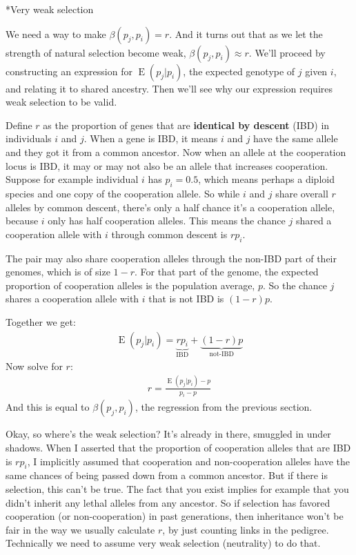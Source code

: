 \documentclass[10pt,reqno]{amsbook}
\makeatletter
\DeclareMathOperator{\E}{E}
\newcommand{\bemph}[1]{{\textbf{\textcolor{bemphcol}{#1}}}}
\renewcommand\subsection{\@startsection{subsection}{2}
\z@{.5\linespacing\@plus.7\linespacing}{-.5em}%
{\normalfont\normalsize\bfseries}}
\numberwithin{equation}{chapter}
\makeatother
\begin{document}
\subsection*{Very weak selection}

We need a way to make $\beta(p_j,p_i) = r$. And it turns out that as we let the strength of natural selection become weak, $\beta(p_j,p_i) \approx r$. We'll proceed by constructing an expression for $\E(p_j|p_i)$, the expected genotype of $j$ given $i$, and relating it to shared ancestry. Then we'll see why our expression requires weak selection to be valid.

Define $r$ as the proportion of genes that are \bemph{identical by descent} (IBD) in individuals $i$ and $j$. When a gene is IBD, it means $i$ and $j$ have the same allele and they got it from a common ancestor. Now when an allele at the cooperation locus is IBD, it may or may not also be an allele that increases cooperation. Suppose for example individual $i$ has $p_i=0.5$, which means perhaps a diploid species and one copy of the cooperation allele. So while $i$ and $j$ share overall $r$ alleles by common descent, there's only a half chance it's a cooperation allele, because $i$ only has half cooperation alleles. This means the chance $j$ shared a cooperation allele with $i$ through common descent is $rp_i$.

The pair may also share cooperation alleles through the non-IBD part of their genomes, which is of size $1-r$. For that part of the genome, the expected proportion of cooperation alleles is the population average, $p$. So the chance $j$ shares a cooperation allele with $i$ that is not IBD is $(1-r)p$.

Together we get:
\begin{align*}
	\E(p_j|p_i) = \underbrace{ r p_i }_\text{IBD} + \underbrace{ (1-r) p }_\text{not-IBD}
\end{align*}
Now solve for $r$:
\begin{align*}
	r = \frac{\E(p_j|p_i)-p}{p_i-p}
\end{align*}
And this is equal to $\beta(p_j,p_i)$, the regression from the previous section.

Okay, so where's the weak selection? It's already in there, smuggled in under shadows. When I asserted that the proportion of cooperation alleles that are IBD is $rp_i$, I implicitly assumed that cooperation and non-cooperation alleles have the same chances of being passed down from a common ancestor. But if there is selection, this can't be true. The fact that you exist implies for example that you didn't inherit any lethal alleles from any ancestor. So if selection has favored cooperation (or non-cooperation) in past generations, then inheritance won't be fair in the way we usually calculate $r$, by just counting links in the pedigree. Technically we need to assume very weak selection (neutrality) to do that. 
\end{document}
